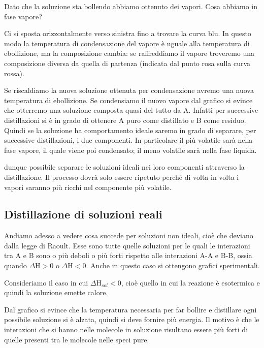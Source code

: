 Dato che la soluzione sta bollendo abbiamo ottenuto dei vapori. Cosa abbiamo in fase vapore?

Ci si sposta orizzontalmente verso sinistra fino a trovare la curva blu. In questo modo la temperatura di condensazione del vapore è uguale alla temperatura di ebollizione, ma la composizione cambia: se raffreddiamo il vapore troveremo una composizione diversa da quella di partenza (indicata dal punto rosa sulla curva rossa).

Se riscaldiamo la nuova soluzione ottenuta per condensazione avremo una nuova temperatura di ebollizione. Se condensiamo il nuovo vapore dal grafico si evince che otterremo una soluzione composta quasi del tutto da A. Infatti per successive distillazioni si è in grado di ottenere A puro come distillato e B come residuo. Quindi se la soluzione ha comportamento ideale saremo in grado di separare, per successive distillazioni, i due componenti. In particolare il più volatile sarà nella fase vapore, il quale viene poi condensato; il meno volatile sarà nella fase liquida.

\E dunque possibile separare le soluzioni ideali nei loro componenti attraverso la distillazione. Il processo dovrà solo essere ripetuto perché di volta in volta i vapori saranno più ricchi nel componente più volatile.
\subsection{Distillazione di soluzioni reali}
Andiamo adesso a vedere cosa succede per soluzioni non ideali, cioè che deviano dalla legge di Raoult. Esse sono tutte quelle soluzioni per le quali le interazioni tra A e B sono o più deboli o più forti rispetto alle interazioni A-A e B-B, ossia quando $\Delta$H$>$0 o $\Delta$H$<$0. Anche in questo caso si ottengono grafici sperimentali.

\vspace{0.2cm}Consideriamo il caso in cui $\Delta$H$_{sol}<$0, cioè quello in cui la reazione è esotermica e quindi la soluzione emette calore.

Dal grafico si evince che la temperatura necessaria per far bollire e distillare ogni possibile soluzione si è alzata, quindi si deve fornire più energia. Il motivo è che le interazioni che si hanno nelle molecole in soluzione risultano essere più forti di quelle presenti tra le molecole nelle speci pure.


